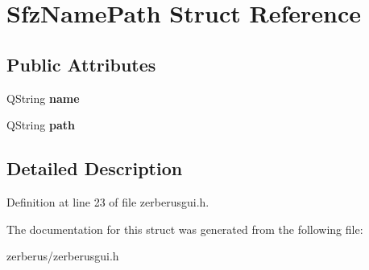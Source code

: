 \hypertarget{struct_sfz_name_path}{}\section{Sfz\+Name\+Path Struct Reference}
\label{struct_sfz_name_path}
\subsection*{Public Attributes}
\begin{DoxyCompactItemize}
\item 
\mbox{\label{struct_sfz_name_path_a37cde753b8e4473cc9b3f345d83f9542}} 
Q\+String {\bfseries name}
\item 
\mbox{\label{struct_sfz_name_path_a46cf09953c71066ce62a290ac3eb2759}} 
Q\+String {\bfseries path}
\end{DoxyCompactItemize}


\subsection{Detailed Description}


Definition at line 23 of file zerberusgui.\+h.



The documentation for this struct was generated from the following file\+:\begin{DoxyCompactItemize}
\item 
zerberus/zerberusgui.\+h\end{DoxyCompactItemize}
